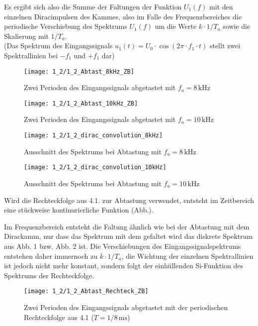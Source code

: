 \documentclass[a4paper, 12pt]{article}
\begin{document}
Es ergibt sich also die Summe der Faltungen der Funktion $U_1(f)$ mit den einzelnen
Diracimpulsen des Kammes, also im Falle des Frequenzbereiches die periodische Verschiebung
des Spektrums $U_1(f)$ um die Werte $k \cdot 1/T_a$ sowie die Skalierung mit
$1/T_a$.\\

(Das Spektrum des Eingangssignals $u_1(t) = U_0 \cdot \cos{(2 \pi \cdot
  f_1 \cdot t)}$ stellt zwei Spektrallinien bei $-f_1$ und $+f_1$ dar)

\begin{figure}[H]
	\texttt{[image: 1\_2/1\_2\_Abtast\_8kHz\_ZB]}
  \caption{Zwei Perioden des Eingangssignals abgetastet mit $f_a=8\,\si{\kilo\hertz}$}
\end{figure}

\begin{figure}[H]
	\texttt{[image: 1\_2/1\_2\_Abtast\_10kHz\_ZB]}
  \caption{Zwei Perioden des Eingangssignals abgetastet mit $f_a=10\,\si{\kilo\hertz}$}
\end{figure}

\begin{figure}[H]
	\texttt{[image: 1\_2/1\_2\_dirac\_convolution\_8kHz]}
  \caption{Ausschnitt des Spektrums bei Abtastung mit $f_a = 8 \, \si{\kilo\hertz}$}
\end{figure}

\begin{figure}[H]
	\texttt{[image: 1\_2/1\_2\_dirac\_convolution\_10kHz]}
  \caption{Ausschnitt des Spektrums bei Abtastung mit $f_a = 10 \, \si{\kilo\hertz}$}
\end{figure}

Wird die Rechteckfolge aus 4.1. zur Abtastung verwendet, entsteht im Zeitbereich
eine stückweise kontinurierliche Funktion (Abb.).

Im Frequenzbereich entsteht die Faltung ähnlich wie bei der Abtastung mit dem
Dirackamm, nur dass das Spektrum mit dem gefaltet wird das diskrete Spektrum aus
Abb. 1 bzw. Abb. 2 ist.
Die Verschiebungen des Eingangssignalspektrums entstehen daher immernoch zu $k
\cdot 1/T_a$, die Wichtung der einzelnen Spektrallinien
ist jedoch nicht mehr konstant, sondern folgt der einhüllenden Si-Funktion des
Spektrums der Rechteckfolge.

\begin{figure}[H]
	\texttt{[image: 1\_2/1\_2\_Abtast\_Rechteck\_ZB]}
  \caption{Zwei Perioden des Eingangssignals abgetastet mit der periodischen
    Rechteckfolge aus 4.1 ($T=1/8 \,\si{\milli\second}$)}
\end{figure}
\end{document}
